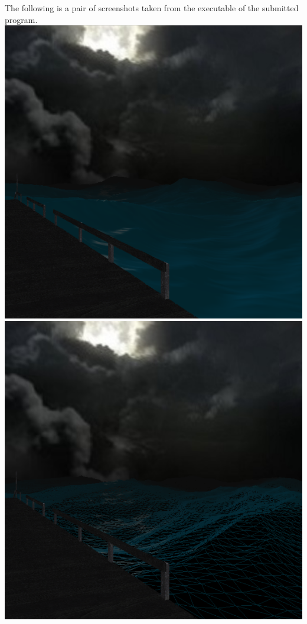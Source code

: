 \documentclass[11pt]{article} %
\begin{document}
The following is a pair of screenshots taken from the executable of the submitted program.\\
\includegraphics{images/render1.png}
\includegraphics{images/render2.png}
\\
\end{document}

